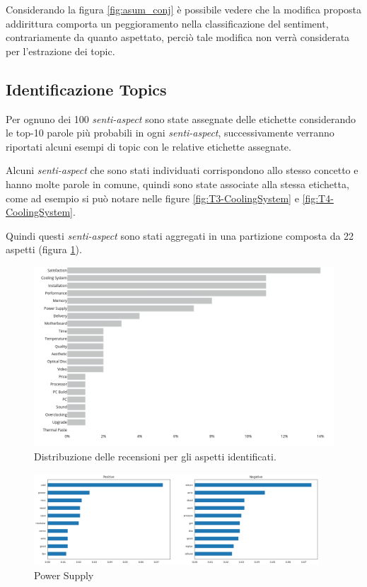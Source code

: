 \newpage
Considerando la figura \ref{fig:asum_conj} è possibile vedere che la modifica proposta addirittura comporta un peggioramento nella classificazione del sentiment, contrariamente da quanto aspettato, perciò tale modifica non verrà considerata per l'estrazione dei topic.

\subsection{Identificazione Topics}
Per ognuno dei 100 \textit{senti-aspect} sono state assegnate delle etichette considerando le top-10 parole più probabili in ogni \textit{senti-aspect}, successivamente verranno riportati alcuni esempi di topic con le relative etichette assegnate.

Alcuni \textit{senti-aspect} che sono stati individuati corrispondono allo
stesso concetto e hanno molte parole in comune, quindi sono state associate alla stessa etichetta, come ad esempio si può notare nelle figure \ref{fig:T3-CoolingSystem} e \ref{fig:T4-CoolingSystem}.

Quindi questi \textit{senti-aspect} sono stati aggregati in una partizione composta da 22 aspetti (figura \ref{fig:ttopics}).

\begin{figure}[ht]
  \centering
  \includegraphics[width=\textwidth]{images/experiments/topics.png}
  \caption{Distribuzione delle recensioni per gli aspetti identificati.}
  \label{fig:ttopics}
\end{figure}

\begin{figure}[p]
  \centering
  \includegraphics[width=0.95\textwidth]{images/experiments/T0-PSU.png}
  \caption{Power Supply}
  \label{fig:T0-PowerSupply}
\end{figure}

